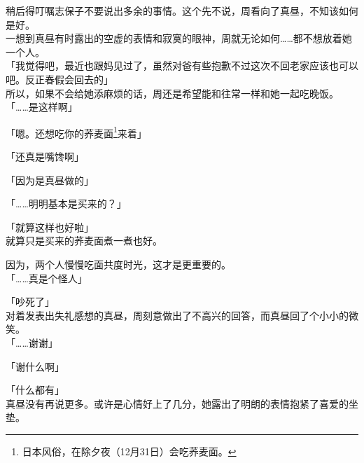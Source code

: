 稍后得叮嘱志保子不要说出多余的事情。这个先不说，周看向了真昼，不知该如何是好。\\

一想到真昼有时露出的空虚的表情和寂寞的眼神，周就无论如何……都不想放着她一个人。\\

「我觉得吧，最近也跟妈见过了，虽然对爸有些抱歉不过这次不回老家应该也可以吧。反正春假会回去的」\\

所以，如果不会给她添麻烦的话，周还是希望能和往常一样和她一起吃晚饭。\\

「……是这样啊」

「嗯。还想吃你的荞麦面\footnote{日本风俗，在除夕夜（12月31日）会吃荞麦面。}来着」

「还真是嘴馋啊」

「因为是真昼做的」

「……明明基本是买来的？」

「就算这样也好啦」\\

就算只是买来的荞麦面煮一煮也好。

因为，两个人慢慢吃面共度时光，这才是更重要的。\\

「……真是个怪人」

「吵死了」\\

对着发表出失礼感想的真昼，周刻意做出了不高兴的回答，而真昼回了个小小的微笑。\\

「……谢谢」

「谢什么啊」

「什么都有」\\

真昼没有再说更多。或许是心情好上了几分，她露出了明朗的表情抱紧了喜爱的坐垫。

